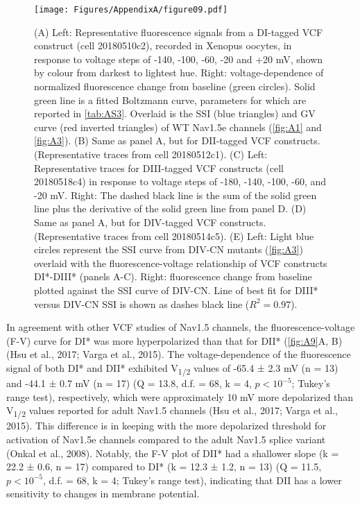 \begin{figure}[t]
\begin{minipage}[c]{85mm}
    \centering
    \texttt{[image: Figures/AppendixA/figure09.pdf]}
\end{minipage}\hfill
\begin{minipage}[c]{70mm}
    \caption{
    (A) Left: Representative fluorescence signals from a DI-tagged VCF construct (cell 20180510c2), recorded in Xenopus oocytes, in response to voltage steps of -140, -100, -60, -20 and +20 mV, shown by colour from darkest to lightest hue. Right: voltage-dependence of normalized fluorescence change from baseline (green circles). Solid green line is a fitted Boltzmann curve, parameters for which are reported in \autoref{tab:AS3}. Overlaid is the SSI (blue triangles) and GV curve (red inverted triangles) of WT Nav1.5e channels (\autoref{fig:A1} and \autoref{fig:A3}).  
    (B) Same as panel A, but for DII-tagged VCF constructs. (Representative traces from cell 20180512c1).  
    (C) Left: Representative traces for DIII-tagged VCF constructs (cell 20180518c4) in response to voltage steps of -180, -140, -100, -60, and -20 mV. Right: The dashed black line is the sum of the solid green line plus the derivative of the solid green line from panel D. 
    (D) Same as panel A, but for DIV-tagged VCF constructs. (Representative traces from cell 20180514c5). 
    (E) Left: Light blue circles represent the SSI curve from DIV-CN mutants (\autoref{fig:A3}) overlaid with the fluorescence-voltage relationship of VCF constructs DI*-DIII* (panels A-C). Right: fluorescence change from baseline plotted against the SSI curve of DIV-CN. Line of best fit for DIII* versus DIV-CN SSI is shown as dashes black line ($R^2 = 0.97$).
    \label{fig:A9}
}
\end{minipage}
\end{figure}

In agreement with other VCF studies of Nav1.5 channels, the fluorescence-voltage (F-V) curve for DI* was more hyperpolarized than that for DII* (\autoref{fig:A9}A, B) (Hsu et al., 2017; Varga et al., 2015). The voltage-dependence of the fluorescence signal of both DI* and DII* exhibited V\textsubscript{1/2} values of -65.4 ± 2.3 mV (n = 13) and -44.1 ± 0.7 mV (n = 17) (Q = 13.8, d.f. = 68, k = 4, $p < 10^{-5}$; Tukey’s range test), respectively, which were approximately 10 mV more depolarized than V\textsubscript{1/2} values reported for adult Nav1.5 channels (Hsu et al., 2017; Varga et al., 2015). This difference is in keeping with the more depolarized threshold for activation of Nav1.5e channels compared to the adult Nav1.5 splice variant (Onkal et al., 2008). Notably, the F-V plot of DII* had a shallower slope (k = 22.2 ± 0.6, n = 17) compared to DI* (k = 12.3 ± 1.2, n = 13) (Q = 11.5, $p < 10^{-5}$, d.f. = 68, k = 4; Tukey’s range test), indicating that DII has a lower sensitivity to changes in membrane potential.

